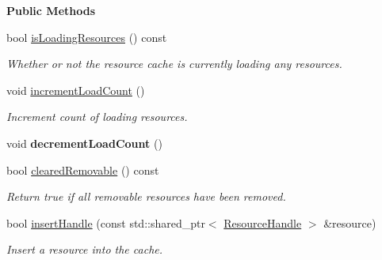 \begin{Indent}\textbf{ Public Methods}\par
\begin{DoxyCompactItemize}
\item 
\mbox{\label{classrev_1_1_resource_cache_ad611f6e8ffb0d69ff36f70230366b73e}} 
bool \mbox{\hyperlink{classrev_1_1_resource_cache_ad611f6e8ffb0d69ff36f70230366b73e}{is\+Loading\+Resources}} () const
\begin{DoxyCompactList}\small\item\em Whether or not the resource cache is currently loading any resources. \end{DoxyCompactList}\item 
\mbox{\label{classrev_1_1_resource_cache_a1a5eff8ef331510ee169bac03ed96d22}} 
void \mbox{\hyperlink{classrev_1_1_resource_cache_a1a5eff8ef331510ee169bac03ed96d22}{increment\+Load\+Count}} ()
\begin{DoxyCompactList}\small\item\em Increment count of loading resources. \end{DoxyCompactList}\item 
\mbox{\label{classrev_1_1_resource_cache_a1a286e97bd8730cefeb452ae2b2756a6}} 
void {\bfseries decrement\+Load\+Count} ()
\item 
\mbox{\label{classrev_1_1_resource_cache_a7c86feb360759a4be4fee0b8d029cf03}} 
bool \mbox{\hyperlink{classrev_1_1_resource_cache_a7c86feb360759a4be4fee0b8d029cf03}{cleared\+Removable}} () const
\begin{DoxyCompactList}\small\item\em Return true if all removable resources have been removed. \end{DoxyCompactList}\item 
bool \mbox{\hyperlink{classrev_1_1_resource_cache_a48e9d7baa0b5c323a27aade413181f36}{insert\+Handle}} (const std\+::shared\+\_\+ptr$<$ \mbox{\hyperlink{classrev_1_1_resource_handle}{Resource\+Handle}} $>$ \&resource)
\begin{DoxyCompactList}\small\item\em Insert a resource into the cache. \end{DoxyCompactList}\item 

\end{DoxyCompactItemize}
\end{Indent}
